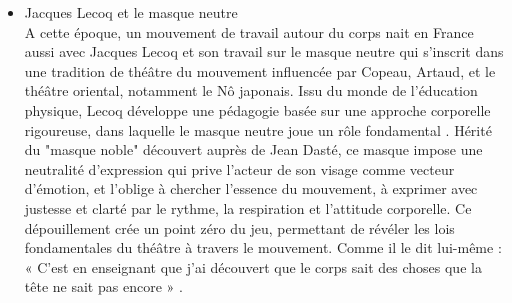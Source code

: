 \begin{itemize}
    \item Jacques Lecoq et le masque neutre
    \\
    A cette époque, un mouvement de travail autour du corps nait en France aussi avec Jacques Lecoq et son 
    travail sur le masque neutre qui s'inscrit dans une tradition de théâtre du mouvement influencée par Copeau, Artaud,
    et le théâtre oriental, notamment le Nô japonais. Issu du monde de l’éducation physique, Lecoq développe une pédagogie
    basée sur une approche corporelle rigoureuse, dans laquelle le masque neutre joue un rôle fondamental \cite{kemp2012embodied}. Hérité du 
    "masque noble" découvert auprès de Jean Dasté, ce masque impose une neutralité d’expression qui prive l’acteur de son 
    visage comme vecteur d’émotion, et l’oblige à chercher l’essence du mouvement, à exprimer avec justesse et clarté par le rythme, 
    la respiration et l’attitude corporelle. Ce dépouillement crée un point zéro du jeu, permettant de révéler les lois fondamentales 
    du théâtre à travers le mouvement. Comme il le dit lui-même : « C’est en enseignant que j’ai découvert que le corps sait des 
    choses que la tête ne sait pas encore » \cite{lecoq2001moving}. 
\end{itemize}

